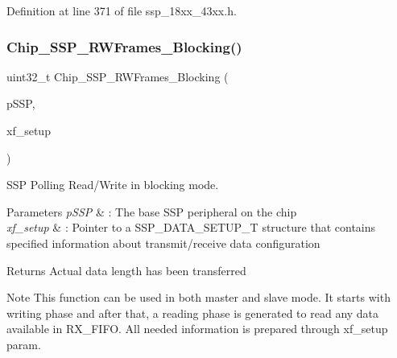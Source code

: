 Definition at line 371 of file ssp\+\_\+18xx\+\_\+43xx.\+h.

\mbox{\label{group___s_s_p__18_x_x__43_x_x_ga302a381ad4d291164144ad2720399078}} 
\subsubsection{\texorpdfstring{Chip\+\_\+\+S\+S\+P\+\_\+\+R\+W\+Frames\+\_\+\+Blocking()}{Chip\_SSP\_RWFrames\_Blocking()}}
{\footnotesize\ttfamily uint32\+\_\+t Chip\+\_\+\+S\+S\+P\+\_\+\+R\+W\+Frames\+\_\+\+Blocking (\begin{DoxyParamCaption}\item[{\hyperlink{struct_l_p_c___s_s_p___t}{L\+P\+C\+\_\+\+S\+S\+P\+\_\+T} $\ast$}]{p\+S\+SP,  }\item[{\hyperlink{struct_chip___s_s_p___d_a_t_a___s_e_t_u_p___t}{Chip\+\_\+\+S\+S\+P\+\_\+\+D\+A\+T\+A\+\_\+\+S\+E\+T\+U\+P\+\_\+T} $\ast$}]{xf\+\_\+setup }\end{DoxyParamCaption})}



S\+SP Polling Read/\+Write in blocking mode. 


\begin{DoxyParams}{Parameters}
{\em p\+S\+SP} & \+: The base S\+SP peripheral on the chip \\
\hline
{\em xf\+\_\+setup} & \+: Pointer to a S\+S\+P\+\_\+\+D\+A\+T\+A\+\_\+\+S\+E\+T\+U\+P\+\_\+T structure that contains specified information about transmit/receive data configuration \\
\hline
\end{DoxyParams}
\begin{DoxyReturn}{Returns}
Actual data length has been transferred 
\end{DoxyReturn}
\begin{DoxyNote}{Note}
This function can be used in both master and slave mode. It starts with writing phase and after that, a reading phase is generated to read any data available in R\+X\+\_\+\+F\+I\+FO. All needed information is prepared through xf\+\_\+setup param. 
\end{DoxyNote}


